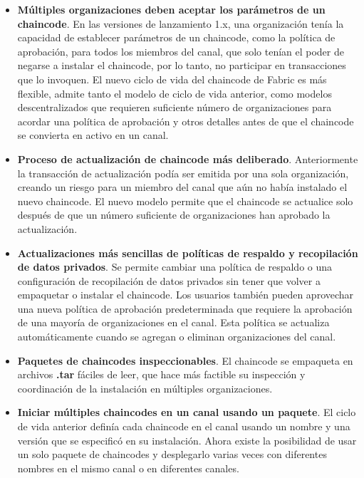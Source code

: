{\begin{itemize}
\item {\bf M\'ultiples organizaciones deben aceptar los par\'ametros de un chaincode}. En las versiones de lanzamiento 1.x, una organizaci\'on ten\'ia la capacidad de establecer par\'ametros de un chaincode, como la pol\'itica de aprobaci\'on, para todos los miembros del canal, que solo ten\'ian el poder de negarse a instalar el chaincode, por lo tanto, no participar en transacciones que lo invoquen. El nuevo ciclo de vida del chaincode de Fabric es m\'as flexible, admite tanto el modelo de ciclo de vida anterior, como modelos descentralizados que requieren suficiente n\'umero de organizaciones para acordar una pol\'itica de aprobaci\'on y otros detalles antes de que el chaincode se convierta en activo en un canal.

\item {\bf Proceso de actualizaci\'on de chaincode m\'as deliberado}. Anteriormente la transacci\'on de actualizaci\'on pod\'ia ser emitida por una sola organizaci\'on, creando un riesgo para un miembro del canal que a\'un no hab\'ia instalado el nuevo chaincode. El nuevo modelo permite que el chaincode se actualice solo despu\'es de que un n\'umero suficiente de organizaciones han aprobado la actualizaci\'on.

\item {\bf Actualizaciones m\'as sencillas de pol\'iticas de respaldo y recopilaci\'on de datos privados}. Se permite cambiar una pol\'itica de respaldo o una configuraci\'on de recopilaci\'on de datos privados sin tener que volver a empaquetar o instalar el chaincode. Los usuarios tambi\'en pueden aprovechar una nueva pol\'itica de aprobaci\'on predeterminada que requiere la aprobaci\'on de una mayor\'ia de organizaciones en el canal. Esta pol\'itica se actualiza autom\'aticamente cuando se agregan o eliminan organizaciones del canal.

\item {\bf Paquetes de chaincodes inspeccionables}. El chaincode se empaqueta en archivos {\bf .tar} f\'aciles de leer, que hace m\'as factible su inspecci\'on y coordinaci\'on de la instalaci\'on en m\'ultiples organizaciones.

\item {\bf Iniciar m\'ultiples chaincodes en un canal usando un paquete}. El ciclo de vida anterior defin\'ia cada chaincode en el canal usando un nombre y una versi\'on que se especific\'o en su instalaci\'on. Ahora existe la posibilidad de usar un solo paquete de chaincodes y desplegarlo varias veces con diferentes nombres en el mismo canal o en diferentes canales.


\end{itemize}}
